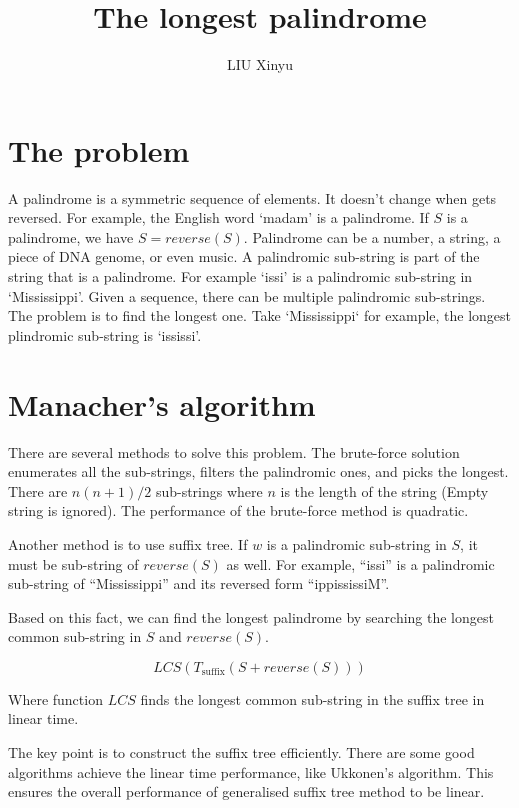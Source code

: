 \documentclass[b5paper]{article}
\begin{document}
\title{The longest palindrome}
\author{LIU Xinyu}
\maketitle

\section{The problem}
A palindrome is a symmetric sequence of elements. It doesn't change when gets reversed.
For example, the English word `madam' is a palindrome. If $S$ is a palindrome, we have
$S = reverse(S)$. Palindrome can be a number, a string, a piece of DNA genome,
or even music. A palindromic sub-string is part of the string that is a palindrome.
For example `issi' is a palindromic sub-string in `Mississippi'. Given a sequence,
there can be
multiple palindromic sub-strings. The problem is to find the longest one.
Take `Mississippi` for example, the longest plindromic sub-string is
`ississi'.

\section{Manacher's algorithm}

There are several methods to solve this problem. The brute-force solution
enumerates all the sub-strings, filters the palindromic ones, and picks the longest.
There are $n(n+1)/2$ sub-strings where $n$ is the length of the string (Empty
string is ignored). The performance of the brute-force method is quadratic.

Another method is to use suffix tree. If $w$ is a palindromic sub-string in
$S$, it must be sub-string of $reverse(S)$ as well.
For example, ``issi'' is a palindromic sub-string of ``Mississippi''
and its reversed form ``ippississiM''.

Based on this fact, we can find the longest palindrome by
searching the longest common sub-string in $S$ and $reverse(S)$.

\begin{equation}
LCS(T_{\textrm{suffix}}(S + reverse(S)))
\end{equation}

Where function $LCS$ finds the
longest common sub-string in the suffix tree in linear time.

The key point is to construct the suffix tree efficiently. There are
some good algorithms achieve the linear time performance, like Ukkonen's algorithm\cite{Ukkonen95}.
This ensures the overall performance of generalised suffix tree method to be linear.
\end{document}
